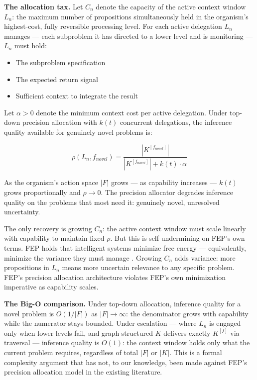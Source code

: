 \documentclass[
]{article}
\providecommand{\tightlist}{%
  \setlength{\itemsep}{0pt}\setlength{\parskip}{0pt}}
\begin{document}
\textbf{The allocation tax.} Let \(C_n\) denote the capacity of the
active context window \(L_n\): the maximum number of propositions
simultaneously held in the organism's highest-cost, fully reversible
processing level. For each active delegation \(L_n\) manages --- each
subproblem it has directed to a lower level and is monitoring ---
\(L_n\) must hold:

\begin{itemize}
\tightlist
\item
  The subproblem specification
\item
  The expected return signal
\item
  Sufficient context to integrate the result
\end{itemize}

Let \(\alpha > 0\) denote the minimum context cost per active
delegation. Under top-down precision allocation with \(k(t)\) concurrent
delegations, the inference quality available for genuinely novel
problems is:

\[\rho(L_n, f_{novel}) = \frac{|K^{[f_{novel}]}|}{|K^{[f_{novel}]}| + k(t) \cdot \alpha}\]

As the organism's action space \(|F|\) grows --- as capability increases
--- \(k(t)\) grows proportionally and \(\rho \to 0\). The precision
allocator degrades inference quality on the problems that most need it:
genuinely novel, unresolved uncertainty.

The only recovery is growing \(C_n\): the active context window must
scale linearly with capability to maintain fixed \(\rho\). But this is
self-undermining on FEP's own terms. FEP holds that intelligent systems
minimize free energy --- equivalently, minimize the variance they must
manage \cite{Friston2010,Friston2017}. Growing \(C_n\) adds variance:
more propositions in \(L_n\) means more uncertain relevance to any
specific problem. FEP's precision allocation architecture violates FEP's
own minimization imperative as capability scales.

\textbf{The Big-O comparison.} Under top-down allocation, inference
quality for a novel problem is \(O(1/|F|)\) as \(|F| \to \infty\): the
denominator grows with capability while the numerator stays bounded.
Under escalation --- where \(L_n\) is engaged only when lower levels
fail, and graph-structured \(K\) delivers exactly \(K^{[f]}\) via
traversal --- inference quality is \(O(1)\): the context window holds
only what the current problem requires, regardless of total \(|F|\) or
\(|K|\). This is a formal complexity argument that has not, to our
knowledge, been made against FEP's precision allocation model in the
existing literature.
\end{document}

